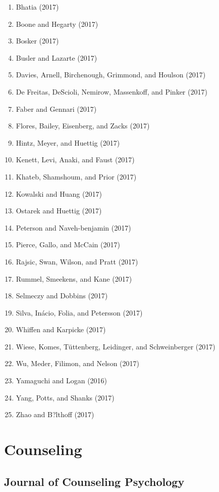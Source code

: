 \documentclass[english,man]{apa6}
\providecommand{\tightlist}{%
  \setlength{\itemsep}{0pt}\setlength{\parskip}{0pt}}
\begin{document}
\begin{enumerate}
\def\labelenumi{\arabic{enumi})}
\tightlist
\item
  Bhatia (2017)
\item
  Boone and Hegarty (2017)
\item
  Bosker (2017)
\item
  Busler and Lazarte (2017)
\item
  Davies, Arnell, Birchenough, Grimmond, and Houlson (2017)
\item
  De Freitas, DeScioli, Nemirow, Massenkoff, and Pinker (2017)
\item
  Faber and Gennari (2017)
\item
  Flores, Bailey, Eisenberg, and Zacks (2017)
\item
  Hintz, Meyer, and Huettig (2017)
\item
  Kenett, Levi, Anaki, and Faust (2017)
\item
  Khateb, Shamshoum, and Prior (2017)
\item
  Kowalski and Huang (2017)
\item
  Ostarek and Huettig (2017)
\item
  Peterson and Naveh-benjamin (2017)
\item
  Pierce, Gallo, and McCain (2017)
\item
  Rajsic, Swan, Wilson, and Pratt (2017)
\item
  Rummel, Smeekens, and Kane (2017)
\item
  Selmeczy and Dobbins (2017)
\item
  Silva, Inácio, Folia, and Petersson (2017)
\item
  Whiffen and Karpicke (2017)
\item
  Wiese, Komes, Tüttenberg, Leidinger, and Schweinberger (2017)
\item
  Wu, Meder, Filimon, and Nelson (2017)
\item
  Yamaguchi and Logan (2016)
\item
  Yang, Potts, and Shanks (2017)
\item
  Zhao and B?lthoff (2017)
\end{enumerate}

\section{Counseling}\label{counseling}

\subsection{Journal of Counseling
Psychology}\label{journal-of-counseling-psychology}
\end{document}
